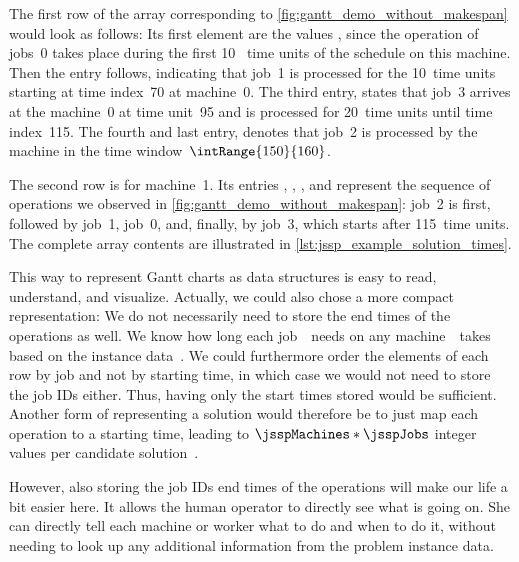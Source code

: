 The first row of the  array corresponding to \autoref{fig:gantt_demo_without_makespan} would look as follows:
Its first element are the values \codeil{[0, 0, 10]}, since the operation of jobs~0 takes place during the first 10~ time units of the schedule on this machine.
Then the entry \codeil{[1, 70, 80]} follows, indicating that job~1 is processed for the 10~time units starting at time index~70 at machine~0.
The third entry, \codeil{[3, 95, 115]} states that job~3 arrives at the machine~0 at time unit~95 and is processed for 20~time units until time index~115.
The fourth and last entry, \codeil{[2, 150, 160]} denotes that job~2 is processed by the machine in the time window~$\intRange{150}{160}$.

The second row is for machine~1.
Its entries \codeil{[2,  30, 50]}, \codeil{[1, 50,  70]}, \codeil{[0,  70,  90]}, and \codeil{[3, 115, 130]} represent the sequence of operations we observed in \autoref{fig:gantt_demo_without_makespan}:
job~2 is first, followed by job~1, job~0, and, finally, by job~3, which starts after 115~time units.
The complete array contents are illustrated in \autoref{lst:jssp_example_solution_times}.

This way to represent Gantt charts as data structures is easy to read, understand, and visualize.
Actually, we could also chose a more compact representation:
We do not necessarily need to store the end times of the operations as well.
We know how long each job~\jsspJobIndex\ needs on any machine~\jsspMachineIndex\ takes based on the instance data~\jsspOperationTime{\jsspJobIndex}{\jsspMachineIndex}.
We could furthermore order the elements of each row by job and not by starting time, in which case we would not need to store the job IDs either.
Thus, having only the start times stored would be sufficient.
Another form of representing a solution would therefore be to just map each operation to a starting time, leading to $\jsspMachines*\jsspJobs$ integer values per candidate solution~\cite{vH2016DPFRASOSOD}.

However, also storing the job IDs end times of the operations will make our life a bit easier here.
It allows the human operator to directly see what is going on.
She can directly tell each machine or worker what to do and when to do it, without needing to look up any additional information from the problem instance data.


